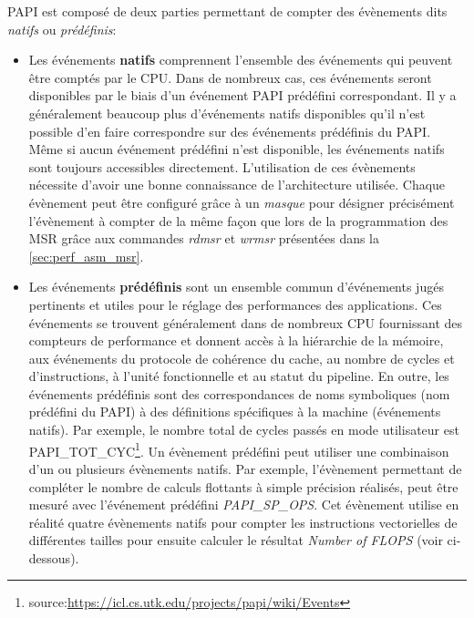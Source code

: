         
            PAPI est composé de deux parties permettant de compter des évènements dits \textit{natifs} ou \textit{prédéfinis}:
            \begin{itemize}
                \item Les événements \textbf{natifs} comprennent l'ensemble des événements qui peuvent être comptés par le CPU. Dans de nombreux cas, ces événements seront disponibles par le biais d'un événement PAPI prédéfini correspondant. Il y a généralement beaucoup plus d'événements natifs disponibles qu'il n'est possible d'en faire correspondre sur des événements prédéfinis du PAPI. Même si aucun événement prédéfini n'est disponible, les événements natifs sont toujours accessibles directement. L'utilisation de ces évènements nécessite d'avoir une bonne connaissance de l'architecture utilisée. Chaque évènement peut être configuré grâce à un \textit{masque} pour désigner précisément l'évènement à compter de la même façon que lors de la programmation des MSR grâce aux commandes \textit{rdmsr} et \textit{wrmsr} présentées dans la \autoref{sec:perf_asm_msr}. 
            
                \item Les événements \textbf{prédéfinis} sont un ensemble commun d'événements jugés pertinents et utiles pour le réglage des performances des applications. Ces événements se trouvent généralement dans de nombreux CPU fournissant des compteurs de performance et donnent accès à la hiérarchie de la mémoire, aux événements du protocole de cohérence du cache, au nombre de cycles et d'instructions, à l'unité fonctionnelle et au statut du pipeline. En outre, les événements prédéfinis sont des correspondances de noms symboliques (nom prédéfini du PAPI) à des définitions spécifiques à la machine (événements natifs). Par exemple, le nombre total de cycles passés en mode utilisateur est PAPI\_TOT\_CYC\footnote{source:\url{https://icl.cs.utk.edu/projects/papi/wiki/Events}}. Un évènement prédéfini peut utiliser une combinaison d'un ou plusieurs évènements natifs. Par exemple, l'évènement permettant de compléter le nombre de calculs flottants à simple précision réalisés, peut être mesuré avec l'événement prédéfini \textit{PAPI\_SP\_OPS}. Cet évènement utilise en réalité quatre évènements natifs pour compter les instructions vectorielles de différentes tailles pour ensuite calculer le résultat \textit{Number of FLOPS} (voir ci-dessous).
            \end{itemize}
            
            

